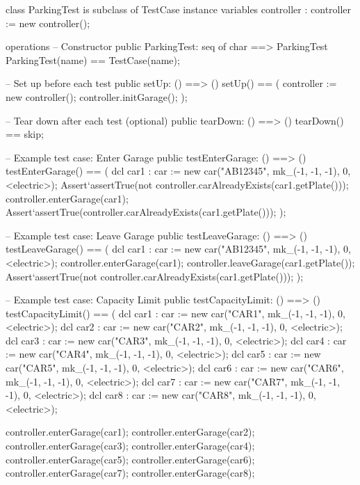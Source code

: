 \documentclass[a4paper]{article}
\begin{document}
\title{}
\author{}
\begin{vdm_al}
class ParkingTest is subclass of TestCase
instance variables
    controller : controller := new controller();

operations
    -- Constructor
    public ParkingTest: seq of char ==> ParkingTest
    ParkingTest(name) == TestCase(name);

    -- Set up before each test
    public setUp: () ==> ()
    setUp() == 
    (
        controller := new controller();
        controller.initGarage();
    );

    -- Tear down after each test (optional)
    public tearDown: () ==> ()
    tearDown() == skip;

  
    -- Example test case: Enter Garage
    public testEnterGarage: () ==> ()
    testEnterGarage() ==
    (
        dcl car1 : car := new car("AB12345", mk_(-1, -1, -1), 0, <electric>);
        Assert`assertTrue(not controller.carAlreadyExists(car1.getPlate()));
        controller.enterGarage(car1);
        Assert`assertTrue(controller.carAlreadyExists(car1.getPlate()));
    );

    -- Example test case: Leave Garage
    public testLeaveGarage: () ==> ()
    testLeaveGarage() ==
    (
        dcl car1 : car := new car("AB12345", mk_(-1, -1, -1), 0, <electric>);
        controller.enterGarage(car1);
        controller.leaveGarage(car1.getPlate());
        Assert`assertTrue(not controller.carAlreadyExists(car1.getPlate()));
    );

    -- Example test case: Capacity Limit
    public testCapacityLimit: () ==> ()
    testCapacityLimit() ==
    (
        dcl car1 : car := new car("CAR1", mk_(-1, -1, -1), 0, <electric>);
        dcl car2 : car := new car("CAR2", mk_(-1, -1, -1), 0, <electric>);
        dcl car3 : car := new car("CAR3", mk_(-1, -1, -1), 0, <electric>);
        dcl car4 : car := new car("CAR4", mk_(-1, -1, -1), 0, <electric>);
        dcl car5 : car := new car("CAR5", mk_(-1, -1, -1), 0, <electric>);
        dcl car6 : car := new car("CAR6", mk_(-1, -1, -1), 0, <electric>);
        dcl car7 : car := new car("CAR7", mk_(-1, -1, -1), 0, <electric>);
        dcl car8 : car := new car("CAR8", mk_(-1, -1, -1), 0, <electric>);
        

        controller.enterGarage(car1);
        controller.enterGarage(car2);
        controller.enterGarage(car3);
        controller.enterGarage(car4);
        controller.enterGarage(car5);
        controller.enterGarage(car6);
        controller.enterGarage(car7);
        controller.enterGarage(car8);
        


\end{vdm_al}
\end{document}
